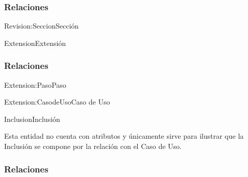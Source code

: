 \subsubsection{Relaciones}

\begin{BusinessFact}{Revision:Seccion}{Sección}
\end{BusinessFact}


\begin{BusinessEntity}{Extension}{Extensión}
\end{BusinessEntity}

\subsubsection{Relaciones}

\begin{BusinessFact}{Extension:Paso}{Paso}
\end{BusinessFact}

\begin{BusinessFact}{Extension:CasodeUso}{Caso de Uso}
\end{BusinessFact}


\begin{BusinessEntity}{Inclusion}{Inclusión}
	\item Esta entidad no cuenta con atributos y únicamente sirve para ilustrar que la Inclusión se compone por la relación con el Caso de Uso.
\end{BusinessEntity}

\subsubsection{Relaciones}

